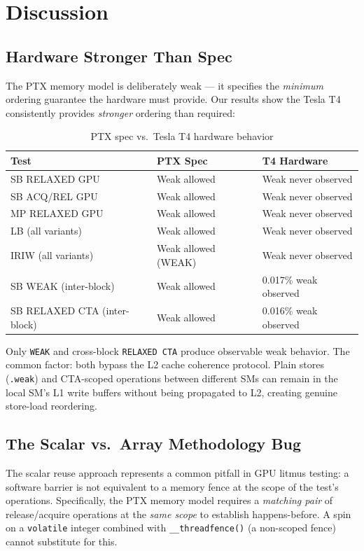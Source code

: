 \documentclass[a4paper]{article}
\begin{document}
\section{Discussion}

\subsection{Hardware Stronger Than Spec}

The PTX memory model is deliberately weak — it specifies the \emph{minimum} ordering guarantee the hardware must provide.
Our results show the Tesla T4 consistently provides \emph{stronger} ordering than required:

\begin{table}[H]
\centering
\small
\caption{PTX spec vs.\ Tesla T4 hardware behavior}
\label{tab:spec-vs-hw}
\begin{tabular}{l l l}
\toprule
\textbf{Test} & \textbf{PTX Spec} & \textbf{T4 Hardware} \\
\midrule
SB RELAXED GPU     & Weak allowed & Weak never observed \\
SB ACQ/REL GPU     & Weak allowed & Weak never observed \\
MP RELAXED GPU     & Weak allowed & Weak never observed \\
LB (all variants)  & Weak allowed & Weak never observed \\
IRIW (all variants)& Weak allowed (WEAK) & Weak never observed \\
\midrule
SB WEAK (inter-block)         & Weak allowed & 0.017\% weak observed \\
SB RELAXED CTA (inter-block)  & Weak allowed & 0.016\% weak observed \\
\bottomrule
\end{tabular}
\end{table}

Only \texttt{WEAK} and cross-block \texttt{RELAXED CTA} produce observable weak behavior.
The common factor: both bypass the L2 cache coherence protocol.
Plain stores (\texttt{.weak}) and CTA-scoped operations between different SMs can remain in the local SM's L1 write buffers without being propagated to L2, creating genuine store-load reordering.

\subsection{The Scalar vs.\ Array Methodology Bug}

The scalar reuse approach represents a common pitfall in GPU litmus testing:
a software barrier is not equivalent to a memory fence at the scope of the test's operations.
Specifically, the PTX memory model requires a \emph{matching pair} of release/acquire operations at the \emph{same scope} to establish happens-before.
A spin on a \texttt{volatile} integer combined with \texttt{\_\_threadfence()} (a non-scoped fence) cannot substitute for this.
\end{document}
